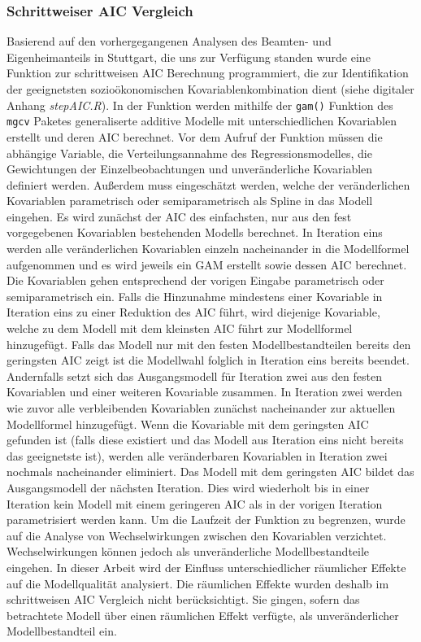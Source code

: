\documentclass{Vorlage}
\begin{document}
\subsubsection{Schrittweiser AIC Vergleich}
Basierend auf den vorhergegangenen Analysen des Beamten- und Eigenheimanteils in Stuttgart, die uns zur Verfügung standen wurde eine Funktion zur schrittweisen AIC \cite{Akaike1981} Berechnung programmiert, die zur Identifikation der geeignetsten sozioökonomischen Kovariablenkombination dient (siehe digitaler Anhang \textit{stepAIC.R}). In der Funktion werden mithilfe der \texttt{gam()} Funktion des \texttt{mgcv} 
Paketes \cite{Wood2011} generaliserte additive Modelle mit unterschiedlichen Kovariablen erstellt und deren AIC 
berechnet. Vor dem Aufruf der Funktion müssen die abhängige Variable, die Verteilungsannahme des Regressionsmodelles, 
die Gewichtungen der Einzelbeobachtungen und unveränderliche Kovariablen definiert werden. Außerdem muss eingeschätzt 
werden, welche der veränderlichen Kovariablen parametrisch oder semiparametrisch als Spline in das Modell eingehen. Es 
wird zunächst der AIC des einfachsten, nur aus den fest vorgegebenen Kovariablen bestehenden Modells berechnet. In 
Iteration eins werden alle veränderlichen Kovariablen einzeln nacheinander in die Modellformel aufgenommen und es wird 
jeweils ein GAM erstellt sowie dessen AIC berechnet. Die Kovariablen gehen entsprechend der vorigen Eingabe parametrisch 
oder semiparametrisch ein. Falls die Hinzunahme mindestens einer Kovariable in Iteration eins zu einer Reduktion des AIC 
führt, wird diejenige Kovariable, welche zu dem Modell mit dem kleinsten AIC führt zur Modellformel hinzugefügt. Falls 
das Modell nur mit den festen Modellbestandteilen bereits den geringsten AIC zeigt ist die Modellwahl folglich in 
Iteration eins bereits beendet.\\ 
Andernfalls setzt sich das Ausgangsmodell für Iteration zwei aus den festen 
Kovariablen und einer weiteren Kovariable zusammen. In Iteration zwei werden wie zuvor alle verbleibenden Kovariablen 
zunächst nacheinander zur aktuellen Modellformel hinzugefügt. Wenn die Kovariable mit dem geringsten AIC gefunden ist 
(falls diese existiert und das Modell aus Iteration eins nicht bereits das geeignetste ist), werden alle veränderbaren 
Kovariablen in Iteration zwei nochmals nacheinander eliminiert. Das Modell mit dem geringsten AIC bildet das 
Ausgangsmodell der nächsten Iteration. Dies wird wiederholt bis in einer Iteration kein Modell mit einem geringeren AIC 
als in der vorigen Iteration parametrisiert werden kann. Um die Laufzeit der Funktion zu begrenzen, wurde auf die 
Analyse von Wechselwirkungen zwischen den Kovariablen verzichtet. Wechselwirkungen können jedoch als unveränderliche 
Modellbestandteile eingehen. In dieser Arbeit wird der Einfluss unterschiedlicher räumlicher Effekte auf die Modellqualität analysiert. Die räumlichen Effekte wurden deshalb im schrittweisen AIC Vergleich nicht berücksichtigt. Sie gingen, sofern das betrachtete Modell über einen räumlichen Effekt verfügte, als unveränderlicher Modellbestandteil ein.
\end{document}
